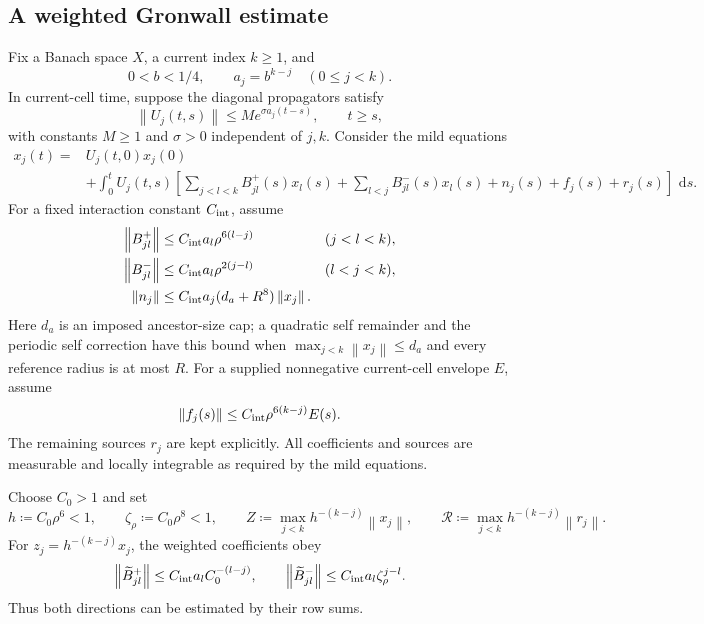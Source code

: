 \documentclass[11pt]{amsart}
\theoremstyle{remark}
\numberwithin{equation}{section}
\newcommand{\norm}[1]{\left\lVert#1\right\rVert}
\newcommand{\dd}{\,\mathrm d}
\begin{document}
\subsection{A weighted Gronwall estimate}
Fix a Banach space $X$, a current index $k\geq1$, and
\[
 0<b<1/4,\qquad a_j=b^{k-j}\quad(0\leq j<k).
\]
In current-cell time, suppose the diagonal propagators satisfy
\begin{equation}\label{ca:eq:diagonal}
 \norm{U_j(t,s)}\leq M e^{\sigma a_j(t-s)},\qquad t\geq s,
\end{equation}
with constants $M\geq1$ and $\sigma>0$ independent of $j,k$.
Consider the mild equations
\begin{equation}\label{ca:eq:system}
 \begin{split}
 x_j(t)={}&U_j(t,0)x_j(0)\\
 &+\int_0^t U_j(t,s)
 \left[\sum_{j<l<k}B^+_{jl}(s)x_l(s)
       +\sum_{l<j}B^-_{jl}(s)x_l(s)
       +n_j(s)+f_j(s)+r_j(s)\right]\,\dd s .
 \end{split}
\end{equation}
For a fixed interaction constant $C_{\rm int}$, assume
\begin{align*}
 \norm{B^+_{jl}}&\leq C_{\rm int}a_l\rho^{6(l-j)} &&(j<l<k),\\
 \norm{B^-_{jl}}&\leq C_{\rm int}a_l\rho^{2(j-l)} &&(l<j<k),\\
 \norm{n_j}&\leq C_{\rm int}a_j(d_a+R^8)\norm{x_j}.
\end{align*}
Here $d_a$ is an imposed ancestor-size cap; a quadratic self remainder
and the periodic self correction have this bound when
$\max_{j<k}\norm{x_j}\leq d_a$ and every reference radius is at most $R$.
For a supplied nonnegative current-cell envelope $E$, assume
\begin{equation}\label{ca:eq:forcing}
 \norm{f_j(s)}\leq C_{\rm int}\rho^{6(k-j)}E(s).
\end{equation}
The remaining sources $r_j$ are kept explicitly. All coefficients and
sources are measurable and locally integrable as required by the mild
equations.

Choose $C_0>1$ and set
\[
 h\coloneqq C_0\rho^6<1,\qquad \zeta_\rho\coloneqq C_0\rho^8<1,\qquad
 Z\coloneqq\max_{j<k}h^{-(k-j)}\norm{x_j},\qquad
 \mathcal R\coloneqq\max_{j<k}h^{-(k-j)}\norm{r_j}.
\]
For $z_j=h^{-(k-j)}x_j$, the weighted coefficients obey
\begin{equation}\label{ca:eq:weightedouter}
 \norm{\widetilde B^+_{jl}}\leq C_{\rm int}a_l C_0^{-(l-j)},\qquad
 \norm{\widetilde B^-_{jl}}\leq C_{\rm int}a_l\zeta_\rho^{j-l}.
\end{equation}
Thus both directions can be estimated by their row sums.
\end{document}
